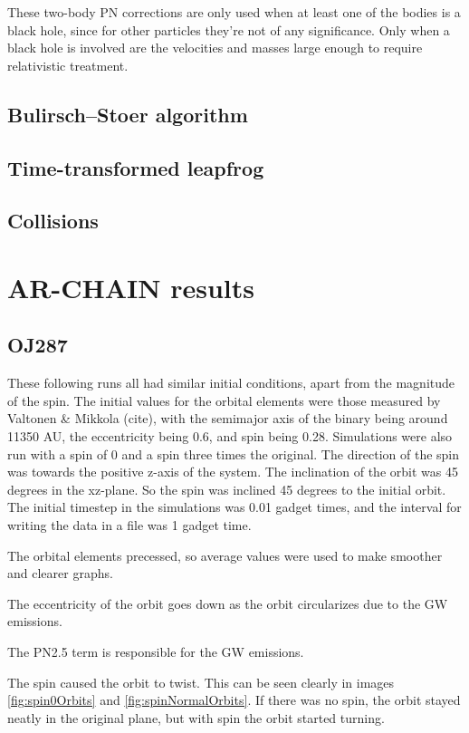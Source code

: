 \documentclass[english, oneside]{HYgradu}
\begin{document}
These two-body PN corrections are only used when at least one of the bodies is a black hole, since for other particles they're not of any significance. Only when a black hole is involved are the velocities and masses large enough to require relativistic treatment.

\section{Bulirsch–Stoer algorithm}
\section{Time-transformed leapfrog}
\section{Collisions}

\chapter{AR-CHAIN results}
\section{OJ287}

These following runs all had similar initial conditions, apart from the magnitude of the spin. The initial values for the orbital elements were those measured by Valtonen \& Mikkola (cite), with the semimajor axis of the binary being around 11350 AU, the eccentricity being 0.6, and spin being 0.28. Simulations were also run with a spin of 0 and a spin three times the original. The direction of the spin was towards the positive z-axis of the system. The inclination of the orbit was 45 degrees in the xz-plane. So the spin was inclined 45 degrees to the initial orbit. The initial timestep in the simulations was 0.01 gadget times, and the interval for writing the data in a file was 1 gadget time. 

The orbital elements precessed, so average values were used to make smoother and clearer graphs. 

The eccentricity of the orbit goes down as the orbit circularizes due to the GW emissions.

The PN2.5 term is responsible for the GW emissions.

The spin caused the orbit to twist. This can be seen clearly in images \ref{fig:spin0Orbits} and \ref{fig:spinNormalOrbits}. If there was no spin, the orbit stayed neatly in the original plane, but with spin the orbit started turning.
\end{document}
